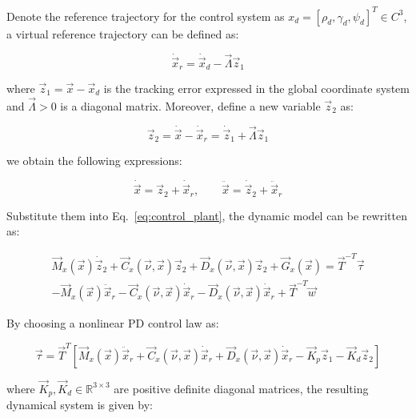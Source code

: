 \begin{sloppypar}
Denote the reference trajectory for the control system as $x_d = [\rho_d, \gamma_d, \psi_d]^T\in C^3$, a virtual reference trajectory can be defined as:

\begin{equation}
\dot{\vec{x}}_r = \dot{\vec{x}}_d - \vec{\Lambda} \vec{z}_1
\end{equation}

\noindent where $\vec{z}_1=\vec{x}-\vec{x}_d$ is the tracking error expressed in the global coordinate system and $\vec{\Lambda} > 0$ is a diagonal matrix. Moreover, define a new variable $\vec{z}_2$ as:

\begin{equation}
\vec{z}_2 = \dot{\vec{x}} - \dot{\vec{x}}_r = \dot{\vec{z}}_1 + \vec{\Lambda}\vec{z}_1
\end{equation}

\noindent we obtain the following expressions:

\begin{equation}
\dot{\vec{x}} = \vec{z}_2 + \dot{\vec{x}}_r,\qquad \ddot{\vec{x}} = \dot{\vec{z}}_2 + \ddot{\vec{x}}_r
\end{equation}

\noindent Substitute them into Eq.~\ref{eq:control_plant}, the dynamic model can be rewritten as:

\begin{equation}
\begin{aligned}
\vec{M}_x(\vec{x})\dot{\vec{z}}_2 + \vec{C}_x(\vec{\nu}, \vec{x})\vec{z}_2 + \vec{D}_x(\vec{\nu}, \vec{x})\vec{z}_2 + \vec{G}_x(\vec{x}) = \vec{T}^{-T}\vec{\tau} \\
-\vec{M}_x(\vec{x})\ddot{\vec{x}}_r - \vec{C}_x(\vec{\nu}, \vec{x})\dot{\vec{x}}_r -  \vec{D}_x(\vec{\nu}, \vec{x})\dot{\vec{x}}_r + \vec{T}^{-T}\vec{w}
\end{aligned}
\end{equation}

By choosing a nonlinear PD control law as:

\begin{equation}
\vec{\tau} = \vec{T}^T\left[ \vec{M}_x(\vec{x})\ddot{\vec{x}}_r + \vec{C}_x(\vec{\nu}, \vec{x})\dot{\vec{x}}_r + \vec{D}_x(\vec{\nu}, \vec{x})\dot{\vec{x}}_r - \vec{K}_p\vec{z}_1 - \vec{K}_d\vec{z}_2 \right]
\end{equation}

\noindent where $\vec{K}_p, \vec{K}_d\in\mathbb{R}^{3\times3}$ are positive definite diagonal matrices, the resulting dynamical system is given by:


\end{sloppypar}
